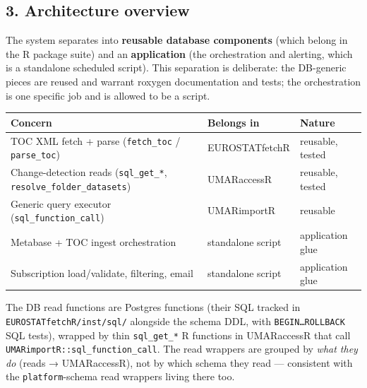 \documentclass[
]{article}
\newcounter{none} %
\begin{document}
\subsection{3. Architecture overview}\label{architecture-overview}

The system separates into \textbf{reusable database components} (which
belong in the R package suite) and an \textbf{application} (the
orchestration and alerting, which is a standalone scheduled script).
This separation is deliberate: the DB-generic pieces are reused and
warrant roxygen documentation and tests; the orchestration is one
specific job and is allowed to be a script.

{\def\LTcaptype{none} %
\begin{longtable}[]{@{}
  >{\raggedright\arraybackslash}p{}
  >{\raggedright\arraybackslash}p{}
  >{\raggedright\arraybackslash}p{}@{}}
\toprule\noalign{}
\begin{minipage}[b]{\linewidth}\raggedright
Concern
\end{minipage} & \begin{minipage}[b]{\linewidth}\raggedright
Belongs in
\end{minipage} & \begin{minipage}[b]{\linewidth}\raggedright
Nature
\end{minipage} \\
\midrule\noalign{}
\endhead
\bottomrule\noalign{}
\endlastfoot
TOC XML fetch + parse (\texttt{fetch\_toc} / \texttt{parse\_toc}) &
EUROSTATfetchR & reusable, tested \\
Change-detection reads (\texttt{sql\_get\_*},
\texttt{resolve\_folder\_datasets}) & UMARaccessR & reusable, tested \\
Generic query executor (\texttt{sql\_function\_call}) & UMARimportR &
reusable \\
Metabase + TOC ingest orchestration & standalone script & application
glue \\
Subscription load/validate, filtering, email & standalone script &
application glue \\
\end{longtable}
}

The DB read functions are Postgres functions (their SQL tracked in
\texttt{EUROSTATfetchR/inst/sql/} alongside the schema DDL, with
\texttt{BEGIN…ROLLBACK} SQL tests), wrapped by thin \texttt{sql\_get\_*}
R functions in UMARaccessR that call
\texttt{UMARimportR::sql\_function\_call}. The read wrappers are grouped
by \emph{what they do} (reads → UMARaccessR), not by which schema they
read --- consistent with the \texttt{platform}-schema read wrappers
living there too.
\end{document}
